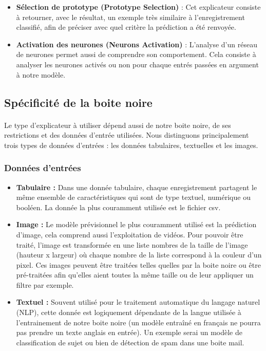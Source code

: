 \begin{itemize}
    \item \textbf{Sélection de prototype (Prototype Selection)} : Cet explicateur consiste à retourner, avec le résultat, un exemple très similaire à l'enregistrement classifié, afin de préciser avec quel critère la prédiction a été renvoyée.
    
    \item \textbf{Activation des neurones (Neurons Activation)} : L'analyse d'un réseau de neurones permet aussi de comprendre son comportement. Cela consiste à analyser les neurones activés ou non pour chaque entrés passées en argument à notre modèle.
\end{itemize}

\subsection{Spécificité de la boite noire}
\paragraph{}Le type d'explicateur à utiliser dépend aussi de notre boite noire, de ses restrictions et des données d'entrée utilisées. Nous distinguons principalement trois types de données d'entrées : les données tabulaires, textuelles et les images.

\subsubsection{Données d'entrées}
\begin{itemize}
    \item \textbf{Tabulaire :} Dans une donnée tabulaire, chaque enregistrement partagent le même ensemble de caractéristiques qui sont de type textuel, numérique ou booléen. La donnée la plus couramment utilisée est le fichier csv.
    
    \item \textbf{Image :} Le modèle prévisionnel le plus couramment utilisé est la prédiction d'image, cela comprend aussi l'exploitation de vidéos. Pour pouvoir être traité, l'image est transformée en une liste nombres de la taille de l'image (hauteur x largeur) où chaque nombre de la liste correspond à la couleur d'un pixel. Ces images peuvent être traitées telles quelles par la boite noire ou être pré-traitées afin qu'elles aient toutes la même taille ou de leur appliquer un filtre par exemple.
    
    \item \textbf{Textuel :} Souvent utilisé pour le traitement automatique du langage naturel (NLP), cette donnée est logiquement dépendante de la langue utilisée à l'entrainement de notre boite noire (un modèle entraîné en français ne pourra pas prendre un texte anglais en entrée). Un exemple serai un modèle de classification de sujet ou bien de détection de spam dans une boite mail.
\end{itemize}

